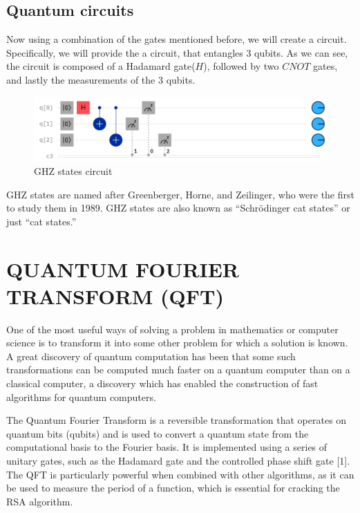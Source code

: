 \documentclass[inscr,ack,preface]{diphdthesis}
\begin{document}
\section{Quantum circuits}

Now using a combination of the gates mentioned before, we will create a circuit. Specifically, we will provide the a circuit, that entangles 3 qubits. As we can see, the circuit is composed of a Hadamard gate($H$), followed by two $CNOT$ gates, and lastly the measurements of the 3 qubits. \cite{ibm}
\begin{figure}[ht]
    \includegraphics[width=1\textwidth]{ghz.png}
    \caption{GHZ states circuit}
    \label{fig:enter-label}
\end{figure}

GHZ states are named after Greenberger, Horne, and Zeilinger, who were the first to study them in 1989. GHZ states are also known as “Schrödinger cat states” or just “cat states.” \cite{ghz_ibm}

\chapter{QUANTUM FOURIER TRANSFORM (QFT)}

One of the most useful ways of solving a problem in mathematics or computer science is to transform it into some other problem for which a solution is known.  A great discovery of quantum computation has been that some such transformations can be computed much faster on a quantum computer than on a classical computer, a discovery which has enabled the construction of fast algorithms for quantum computers.

The Quantum Fourier Transform is a reversible transformation that operates on quantum bits (qubits) and is used to convert a quantum state from the computational basis to the Fourier basis. It is implemented using a series of unitary gates, such as the Hadamard gate and the controlled phase shift gate [1]. The QFT is particularly powerful when combined with other algorithms, as it can be used to measure the period of a function, which is essential for cracking the RSA algorithm.
\end{document}
